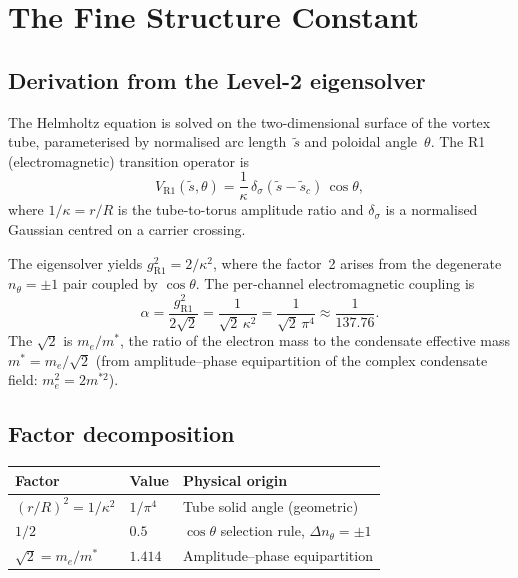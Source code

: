 \documentclass[11pt,a4paper]{article}
\begin{document}
\section{The Fine Structure Constant}
\label{sec:alpha}

\subsection{Derivation from the Level-2 eigensolver}

The Helmholtz equation is solved on the two-dimensional surface
of the vortex tube, parameterised by normalised arc
length~$\tilde{s}$ and poloidal angle~$\theta$.  The R1
(electromagnetic) transition operator is
\begin{equation}
  V_{\text{R1}}(\tilde{s}, \theta) =
    \frac{1}{\kappa}\,\delta_\sigma(\tilde{s} - \tilde{s}_c)
    \,\cos\theta,
  \label{eq:VR1}
\end{equation}
where $1/\kappa = r/R$ is the tube-to-torus amplitude ratio and
$\delta_\sigma$ is a normalised Gaussian centred on a carrier
crossing.

The eigensolver yields $g^2_{\text{R1}} = 2/\kappa^2$, where
the factor~2 arises from the degenerate
$n_\theta = \pm 1$ pair coupled by $\cos\theta$.
The per-channel electromagnetic coupling is
\begin{equation}
  \boxed{\alpha = \frac{g^2_{\text{R1}}}{2\sqrt{2}}
    = \frac{1}{\sqrt{2}\,\kappa^2}
    = \frac{1}{\sqrt{2}\,\pi^4}
    \approx \frac{1}{137.76}.}
  \label{eq:alpha}
\end{equation}
The $\sqrt{2}$ is $m_e/m^*$, the ratio of the electron mass to
the condensate effective mass $m^* = m_e/\sqrt{2}$ (from
amplitude--phase equipartition of the complex condensate field:
$m_e^2 = 2m^{*2}$).

\subsection{Factor decomposition}

\begin{center}
\begin{tabular}{lll}
\toprule
Factor & Value & Physical origin \\
\midrule
$(r/R)^2 = 1/\kappa^2$ & $1/\pi^4$ &
  Tube solid angle (geometric) \\
$1/2$ & $0.5$ &
  $\cos\theta$ selection rule, $\Delta n_\theta = \pm 1$ \\
$\sqrt{2} = m_e/m^*$ & $1.414$ &
  Amplitude--phase equipartition \\
\bottomrule
\end{tabular}
\end{center}
\end{document}
